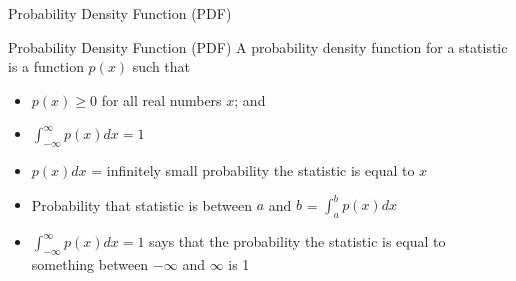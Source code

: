 \documentclass{beamer}
\begin{document}
\begin{frame}{Probability Density Function (PDF)}
    \begin{block}{Probability Density Function (PDF)}
    A probability density function for a statistic is a function $p(x)$ such that \begin{itemize}
        \item $p(x) \geq 0$ for all real numbers $x$; and
        \item $\int_{-\infty}^{\infty} p(x)dx = 1$
    \end{itemize}
    \end{block}

    \begin{itemize}
        \item $p(x)dx$ = infinitely small probability the statistic is equal to $x$
        \item Probability that statistic is between $a$ and $b$ = $\int_a^b p(x)dx$
        \item $\int_{-\infty}^{\infty} p(x)dx = 1$ says that the probability the statistic is equal to something between $-\infty$ and $\infty$ is 1
    \end{itemize}
    
\end{frame}
\end{document}
